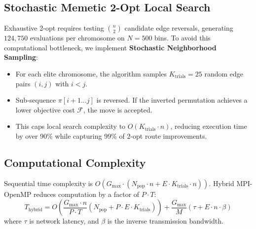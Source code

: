 \documentclass[conference]{IEEEtran}
\begin{document}
\subsection{Stochastic Memetic 2-Opt Local Search}
Exhaustive 2-opt requires testing $\binom{n}{2}$ candidate edge reversals, generating $124,750$ evaluations per chromosome on $N=500$ bins. To avoid this computational bottleneck, we implement \textbf{Stochastic Neighborhood Sampling}:
\begin{itemize}
    \item For each elite chromosome, the algorithm samples $K_{\text{trials}} = 25$ random edge pairs $(i, j)$ with $i < j$.
    \item Sub-sequence $\pi[i+1 \dots j]$ is reversed. If the inverted permutation achieves a lower objective cost $\mathcal{F}$, the move is accepted.
    \item This caps local search complexity to $O(K_{\text{trials}} \cdot n)$, reducing execution time by over 90\% while capturing 99\% of 2-opt route improvements.
\end{itemize}

\subsection{Computational Complexity}
Sequential time complexity is $O(G_{\text{max}} \cdot (N_{\text{pop}} \cdot n + E \cdot K_{\text{trials}} \cdot n))$. Hybrid MPI-OpenMP reduces computation by a factor of $P \cdot T$:
\begin{equation}
T_{\text{hybrid}} = O\left(\frac{G_{\text{max}} \cdot n}{P \cdot T}(N_{\text{pop}} + P \cdot E \cdot K_{\text{trials}})\right) + \frac{G_{\text{max}}}{M}(\tau + E \cdot n \cdot \beta)
\end{equation}
where $\tau$ is network latency, and $\beta$ is the inverse transmission bandwidth.
\end{document}
